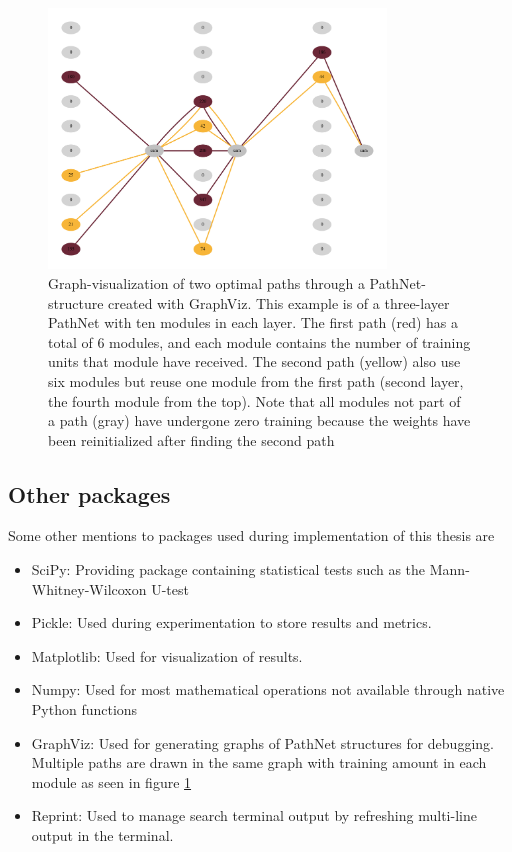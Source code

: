 \begin{figure}[ht]
    \centering
    \includegraphics[width=0.8\textwidth]{Chapters/3.Implementation/figures/pathnet_visualization.pdf}
    \caption[GraphViz example]{Graph-visualization of two optimal paths through a PathNet-structure created with GraphViz. This example is of a three-layer PathNet with ten modules in each layer. The first path (red) has a total of 6 modules, and each module contains the number of training units that module have received. The second path (yellow) also use six modules but reuse one module from the first path (second layer, the fourth module from the top). Note that all modules not part of a path (gray) have undergone zero training because the weights have been reinitialized after finding the second path}
    \label{fig:pathnetexample}
\end{figure}

\subsection{Other packages}
Some other mentions to packages used during implementation of this thesis are
\begin{itemize}
    \item SciPy: Providing package containing statistical tests such as the Mann-Whitney-Wilcoxon U-test
    \item Pickle: Used during experimentation to store results and metrics.
    \item Matplotlib: Used for visualization of results.
    \item Numpy: Used for most mathematical operations not available through native Python functions 
    \item GraphViz: Used for generating graphs of PathNet structures for debugging. Multiple paths are drawn in the same graph with training amount in each module as seen in figure \ref{fig:pathnetexample}
    \item Reprint: Used to manage search terminal output by refreshing multi-line output in the terminal.
\end{itemize}

